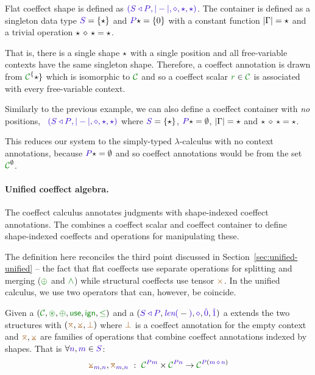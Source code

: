 \begin{example}
Flat coeffect shape is defined as $\sclrd{(\SHP, {|}-{|}, \diamond, \sflat, \sflat)}$.
The container is defined as a singleton data type $\SH = \{\sflat \}$ and $\SP \sflat = \{ 0 \}$
with a constant function ${|}\Gamma{|}=\star$ and a trivial operation $\star\,\diamond\,\star = \star$. 

That is, there is a single shape
$\star$ with a single position and all free-variable contexts have the same singleton shape.
Therefore, a coeffect annotation is drawn from $\C^\{\sflat\}$ which is isomorphic to $\C$
and so a coeffect scalar $\cclrd{r}\in \C$ is associated with every free-variable context.
\end{example}

\newpage
\begin{example}
Similarly to the previous example, we can also define a coeffect container with \emph{no} positions,
\ie~$\sclrd{(\SHP, {|}-{|}, \diamond, \sflat, \sflat)}$ where $\SH = \{\sflat \}$, $\SP \sflat = \emptyset$,
${|}\Gamma{|}=\star$ and $\star\,\diamond\,\star = \star$. 

This reduces our system to the simply-typed $\lambda$-calculus with no context annotations, because
$\SP\sflat=\emptyset$ and so coeffect annotations would be from the set $\C^\emptyset$.
\end{example}


\paragraph{Unified coeffect algebra.}
The coeffect calculus annotates judgments with shape-indexed coeffect annotations.
The \emph{} combines a coeffect scalar and coeffect container
to define shape-indexed coeffects and operations for manipulating these. 

The definition here reconciles the third point discussed in Section~\ref{sec:unified-unified} --
the fact that flat coeffects use separate operations for splitting and merging ($\cpar$ and $\czip$)
while structural coeffects use tensor $\atimes$. In the unified calculus, we use two operators
that can, however, be coincide.

\begin{definition}
Given a  $(\C, \cseq, \cpar, \cunit, \czero, \cleq)$ and a 
 $(\SHP, \slen{-}, \stimes, \sempty, \sunit)$ a \emph{} extends the two structures with $(\azip, \apar, \azero)$ where $\azero$ is a 
coeffect annotation for the empty context and $\azip, \apar$ are families of operations that 
combine coeffect annotations indexed by shapes. That is $\forall \sclrd{n},\sclrd{m} \in \SH$:
%
\begin{equation*}
\apar_{\sclrd{m},\sclrd{n}}, \azip_{\sclrd{m},\sclrd{n}} ~:~ \C^{\SP \sclrd{m}} \times \C^{\SP \sclrd{n}} \rightarrow \C^{\SP (\sclrd{m}\,\stimes\,\sclrd{n})}
\end{equation*}
\end{definition}

